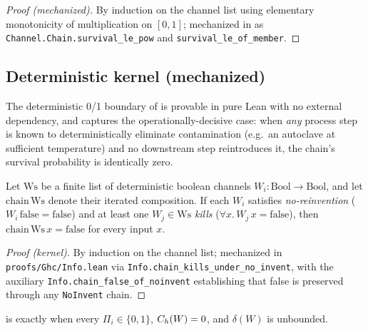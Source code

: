 \begin{proof}[Proof (mechanized)]
By induction on the channel list using elementary monotonicity of
multiplication on $[0, 1]$; mechanized in
 as
\texttt{Channel.Chain.survival\_le\_pow} and
\texttt{survival\_le\_of\_member}.
\end{proof}

\subsection{Deterministic kernel (mechanized)}

The deterministic 0/1 boundary of  is provable in
pure Lean with no external dependency, and captures the
operationally-decisive case: when \emph{any} process step is known to
deterministically eliminate contamination (e.g.\ an autoclave at
sufficient temperature) and no downstream step reintroduces it, the
chain's survival probability is identically zero.

\begin{theorem}
\label{thm:survival-kernel}
Let $\mathrm{Ws}$ be a finite list of deterministic boolean channels
$W_i \colon \mathrm{Bool} \to \mathrm{Bool}$, and let
$\mathrm{chain}\,\mathrm{Ws}$ denote their iterated composition. If
each $W_i$ satisfies \emph{no-reinvention} ($W_i\,\mathrm{false} =
\mathrm{false}$) and at least one $W_j \in \mathrm{Ws}$ \emph{kills}
($\forall x.\,W_j\,x = \mathrm{false}$), then
$\mathrm{chain}\,\mathrm{Ws}\,x = \mathrm{false}$ for every input $x$.
\end{theorem}

\begin{proof}[Proof (kernel)]
By induction on the channel list; mechanized in
\texttt{proofs/Ghc/Info.lean} via
\texttt{Info.chain\_kills\_under\_no\_invent}, with the auxiliary
\texttt{Info.chain\_false\_of\_noinvent} establishing that
\textsf{false} is preserved through any \texttt{NoInvent} chain.
\end{proof}

 is exactly  when every
$\Pi_i \in \{0,1\}$, $C_{h}(W) = 0$, and $\delta(W)$ is unbounded.
